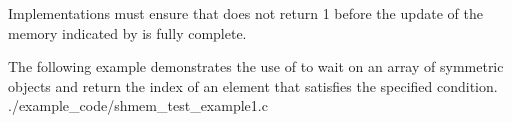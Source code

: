 \begin{apidefinition}
{  Implementations must ensure that  does not return 1 before
  the update of the memory indicated by  is fully complete.
}


\begin{apiexamples}
  \apicexample
      {The following example demonstrates the use of  to
        wait on an array of symmetric objects and return the index of an
        element that satisfies the specified condition.}
      {./example_code/shmem_test_example1.c}
      {}
\end{apiexamples}

\end{apidefinition}
